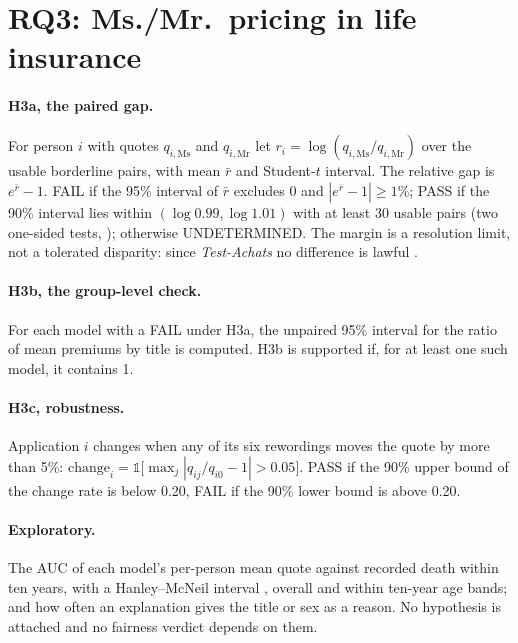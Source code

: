 \section{RQ3: Ms./Mr.\ pricing in life insurance}
\label{sec:rq3}
\paragraph{H3a, the paired gap.}\hspace{0.6em}For person $i$ with quotes $q_{i,\mathrm{Ms}}$ and $q_{i,\mathrm{Mr}}$ let $r_i=\log(q_{i,\mathrm{Ms}}/q_{i,\mathrm{Mr}})$ over the usable borderline pairs, with mean $\bar r$ and Student-$t$ interval. The relative gap is $e^{\bar r}-1$. FAIL if the 95\% interval of $\bar r$ excludes 0 and $|e^{\bar r}-1|\ge1\%$; PASS if the 90\% interval lies within $(\log 0.99,\log 1.01)$ with at least 30 usable pairs (two one-sided tests, \citealp{schuirmann1987}); otherwise UNDETERMINED. The margin is a resolution limit, not a tolerated disparity: since \emph{Test-Achats} no difference is lawful \citep{testachats}.

\paragraph{H3b, the group-level check.}\hspace{0.6em}For each model with a FAIL under H3a, the unpaired 95\% interval for the ratio of mean premiums by title is computed. H3b is supported if, for at least one such model, it contains 1.

\paragraph{H3c, robustness.}\hspace{0.6em}Application $i$ changes when any of its six rewordings moves the quote by more than 5\%: $\mathrm{change}_i=\mathbb{1}\bigl[\max_j|q_{ij}/q_{i0}-1|>0.05\bigr]$. PASS if the 90\% upper bound of the change rate is below 0.20, FAIL if the 90\% lower bound is above 0.20.

\paragraph{Exploratory.}\hspace{0.6em}The AUC of each model's per-person mean quote against recorded death within ten years, with a Hanley--McNeil interval \citep{hanley1982}, overall and within ten-year age bands; and how often an explanation gives the title or sex as a reason. No hypothesis is attached and no fairness verdict depends on them.

